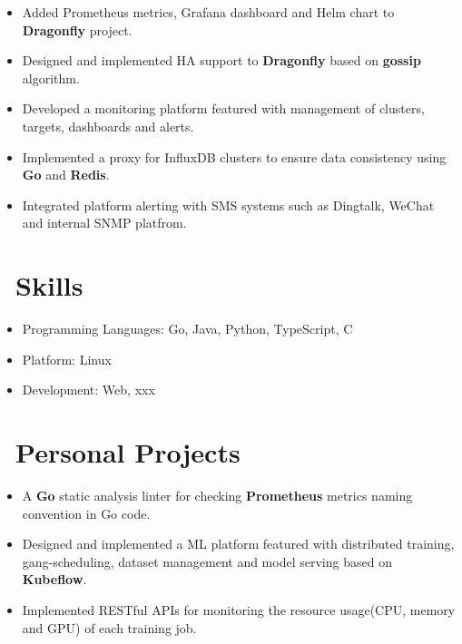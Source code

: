 \documentclass{resume}
\begin{document}
\begin{itemize}
  \item Added Prometheus metrics, Grafana dashboard and Helm chart to \textbf{Dragonfly} project.
  \item Designed and implemented HA support to \textbf{Dragonfly} based on \textbf{gossip} algorithm. 
\end{itemize}

\begin{itemize}
  \item Developed a monitoring platform featured with management of clusters, targets, dashboards and alerts.
  \item Implemented a proxy for InfluxDB clusters to ensure data consistency using \textbf{Go} and \textbf{Redis}.
  \item Integrated platform alerting with SMS systems such as Dingtalk, WeChat and internal SNMP platfrom.
\end{itemize}

\section{\faKey\ Skills}
\begin{itemize}[parsep=0.5ex]
  \item Programming Languages: Go, Java, Python, TypeScript, C
  \item Platform: Linux
  \item Development: Web, xxx
\end{itemize}

\section{\faCogs\ Personal Projects}
\begin{itemize}
  \item A \textbf{Go} static analysis linter for checking \textbf{Prometheus} metrics naming convention in Go code.
\end{itemize}

\begin{itemize}
  \item Designed and implemented a ML platform featured with distributed training, gang-scheduling, dataset management and model serving based on \textbf{Kubeflow}.
  \item Implemented RESTful APIs for monitoring the resource usage(CPU, memory and GPU) of each training job.
\end{itemize}
\end{document}
